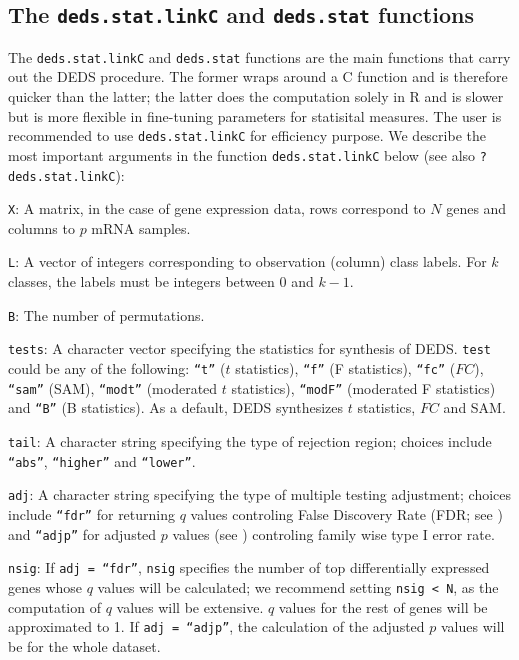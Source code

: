 \documentclass[11pt]{article}
\newcommand{\code}[1]{{\tt #1}}
\newcommand{\Rfunc}[1]{{\tt #1}}
\begin{document}
\subsection{The \Rfunc{deds.stat.linkC} and \Rfunc{deds.stat} functions}
The \Rfunc{deds.stat.linkC} and \Rfunc{deds.stat} functions are the main 
functions that carry out the DEDS procedure. The former wraps around a
C function and is therefore quicker than the latter; the latter does the 
computation solely in R and is slower but is more flexible in fine-tuning parameters
for statisital measures. The user is recommended to use \Rfunc{deds.stat.linkC}
for efficiency purpose. We describe the most important arguments in the function \Rfunc{deds.stat.linkC} below (see also \code{?deds.stat.linkC}):
\begin{description}
  \item{\code{X}: }{A  matrix, in the case of gene expression data, 
    rows correspond to $N$ genes and columns to $p$ mRNA samples.}
  \item{\code{L}: }{A vector of integers corresponding to observation (column)
    class labels. For $k$ classes, the labels must be integers
    between 0 and $k-1$.}
  \item{\code{B}: }{The number of permutations.}
  \item{\code{tests}: }{A character vector specifying the statistics
      for synthesis of DEDS. \code{test} could be any of the
      following: \code{``t''} ($t$ statistics), \code{``f''} (F statistics),
      \code{``fc''} ($FC$), \code{``sam''} (SAM), \code{``modt''} (moderated 
      $t$ statistics), \code{``modF''} (moderated F statistics) and 
      \code{``B''} (B statistics). As a default, DEDS synthesizes $t$ statistics, 
      $FC$ and SAM.}
 \item{\code{tail}: }{ A character string specifying the type of rejection
    region; choices include \code{``abs''}, \code{``higher''} and \code{``lower''}.}
 \item{\code{adj}: }{ A character string specifying the type of multiple testing
    adjustment; choices include \code{``fdr''} for returning $q$ values controling False 
    Discovery Rate (FDR; see \cite{Benjamini&Hochberg95}) and \code{``adjp''}
    for adjusted $p$ values (see \cite{Dudoit&Shaffer02}) controling family wise type I error rate.} 
 \item{\code{nsig}: }{ If \code{adj = ``fdr''}, \code{nsig} specifies the number of top
    differentially expressed genes whose $q$ values will be calculated; we recommend 
    setting \code{nsig < N}, as the computation of $q$ values will be extensive. $q$ values
    for the rest of genes will be approximated to 1. If \code{adj = ``adjp''}, the 
    calculation of the adjusted $p$ values will be for the whole dataset.}
\end{description}
\end{document}
